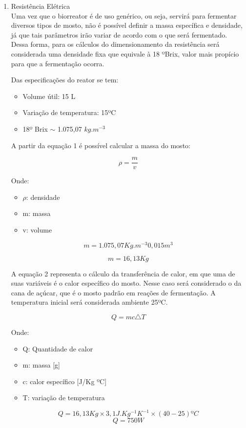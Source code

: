 \begin{enumerate}
	\item Resistência Elétrica \\
	Uma vez que o biorreator é de uso genérico, ou seja, servirá para fermentar diversos tipos de mosto, não é possível definir a massa específica e densidade, já que tais parâmetros irão variar de acordo com o que será fermentado. Dessa forma, para os cálculos do dimensionamento da resistência será considerada uma densidade fixa que equivale à 18 ºBrix, valor mais propício para que a fermentação ocorra.

	Das especificações do reator se tem:
	\begin{itemize}
		\item Volume útil: 15 L
		\item Variação de temperatura: 15ºC
		\item 18º Brix \(\sim\) 1.075,07 \(kg.m^{-3}\)
	\end{itemize}

A partir da equação 1 é possível calcular a massa do mosto:

\[\rho = \frac{m}{v}\]

Onde:

\begin{itemize}
	\item \(\rho\): densidade
	\item m: massa
	\item v: volume
\end{itemize}

\[m = 1.075,07 Kg.m^{-3} 0,015 m^3\]

\[m = 16, 13 Kg\]

A equação 2 representa o cálculo da transferência de calor, em que uma de suas variáveis é o calor específico do mosto. Nesse caso será considerado o da cana de açúcar, que é o mosto padrão em reações de fermentação. A temperatura inicial será considerada ambiente 25ºC.

\[Q = m c \triangle T\]

Onde:

\begin{itemize}
	\item Q: Quantidade de calor
	\item m: massa [g]
	\item c: calor específico [J/Kg ºC]
	\item T: variação de temperatura
\end{itemize}


\[Q = 16,13 Kg \times 3,1J.Kg^{-1}K^{-1} \times (40 - 25)ºC\]
\[Q= 750 W\]


\end{enumerate}
